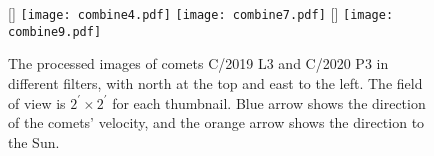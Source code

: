 


    
\begin{figure}
    \centering
    [\linewidth]{
        \texttt{[image: combine4.pdf]}
        \texttt{[image: combine7.pdf]}
    }
    [\linewidth]{
        \texttt{[image: combine9.pdf]}
    }
    \caption{The processed images of comets C/2019 L3  and C/2020 P3  in different filters, with north at the top and east to the left. The field of view is $ 2^{\prime} \times 2^{\prime} $ for each thumbnail. Blue arrow shows the direction of the comets' velocity, and the orange arrow shows the direction to the Sun. }
    \label{fig:combinedimg}
\end{figure}

